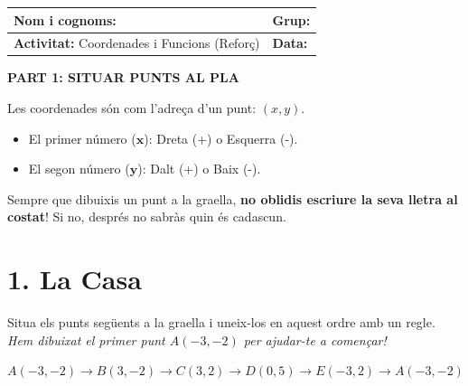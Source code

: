 \documentclass[12pt,a4paper]{article}
\begin{document}
\begingroup
\renewcommand{\arraystretch}{2.2}
\begin{tabularx}{\textwidth}{|X|p{4cm}|}
    \hline
    \textbf{Nom i cognoms:} & \textbf{Grup:} \\ \hline
    \textbf{Activitat:} Coordenades i Funcions (Reforç) & \textbf{Data:} \\ \hline
\end{tabularx}
\endgroup

\vspace{0.5cm}

\begin{center}
    {\Large \textbf{PART 1: SITUAR PUNTS AL PLA}}
\end{center}

\begin{tcolorbox}[colback=blue!5,colframe=blue!40,title=\textbf{Recorda!}]
    Les coordenades són com l'adreça d'un punt: $(x, y)$.
    \begin{itemize}
        \item El primer número ($\mathbf{x}$): Dreta (+) o Esquerra (-).
        \item El segon número ($\mathbf{y}$): Dalt (+) o Baix (-).
    \end{itemize}
\end{tcolorbox}

\begin{tcolorbox}[colback=red!5,colframe=red!40,title=\textbf{Molt Important!}]
    Sempre que dibuixis un punt a la graella, \textbf{no oblidis escriure la seva lletra al costat}! Si no, després no sabràs quin és cadascun.
\end{tcolorbox}

\section*{1. La Casa}
Situa els punts següents a la graella i uneix-los en aquest ordre amb un regle. \\
\textit{Hem dibuixat el primer punt $A(-3, -2)$ per ajudar-te a començar!}

$A(-3, -2) \to B(3, -2) \to C(3, 2) \to D(0, 5) \to E(-3, 2) \to A(-3, -2)$

\begin{center}
\end{center}
\end{document}
